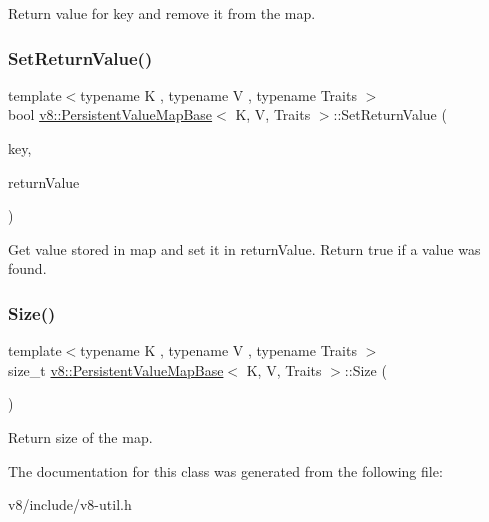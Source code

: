 Return value for key and remove it from the map. \mbox{\label{classv8_1_1PersistentValueMapBase_a85201649d2bbd0ffdebe8be3d5c6447a}} 
\subsubsection{\texorpdfstring{Set\+Return\+Value()}{SetReturnValue()}}
{\footnotesize\ttfamily template$<$typename K , typename V , typename Traits $>$ \\
bool \mbox{\hyperlink{classv8_1_1PersistentValueMapBase}{v8\+::\+Persistent\+Value\+Map\+Base}}$<$ K, V, Traits $>$\+::Set\+Return\+Value (\begin{DoxyParamCaption}\item[{const K \&}]{key,  }\item[{\mbox{\hyperlink{classv8_1_1ReturnValue}{Return\+Value}}$<$ \mbox{\hyperlink{classv8_1_1Value}{Value}} $>$}]{return\+Value }\end{DoxyParamCaption})\hspace{0.3cm}{\ttfamily [inline]}}

Get value stored in map and set it in return\+Value. Return true if a value was found. \mbox{\label{classv8_1_1PersistentValueMapBase_ade5c5db2a968fdabe073649e85b837eb}} 
\subsubsection{\texorpdfstring{Size()}{Size()}}
{\footnotesize\ttfamily template$<$typename K , typename V , typename Traits $>$ \\
size\+\_\+t \mbox{\hyperlink{classv8_1_1PersistentValueMapBase}{v8\+::\+Persistent\+Value\+Map\+Base}}$<$ K, V, Traits $>$\+::Size (\begin{DoxyParamCaption}{ }\end{DoxyParamCaption})\hspace{0.3cm}{\ttfamily [inline]}}

Return size of the map. 

The documentation for this class was generated from the following file\+:\begin{DoxyCompactItemize}
\item 
v8/include/v8-\/util.\+h\end{DoxyCompactItemize}
